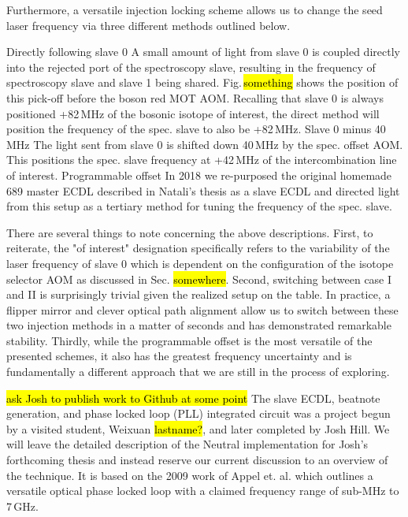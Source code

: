 Furthermore, a versatile injection locking scheme allows us to change the seed laser frequency via three different methods outlined below.
\begin{outline}[enumerate]
	\1 Directly following slave 0
		\2 A small amount of light from slave 0 is coupled directly into the rejected port of the spectroscopy slave, resulting in the frequency of spectroscopy slave and slave 1 being shared. 
		Fig.\,\hl{something} shows the position of this pick-off before the boson red MOT AOM. 
		Recalling that slave 0 is always positioned +82\,MHz of the bosonic isotope of interest, the direct method will position the frequency of the spec. slave to also be +82\,MHz.
	\1 Slave 0 minus 40\,MHz
		\2 The light sent from slave 0 is shifted down 40\,MHz by the spec. offset AOM. This positions the spec. slave frequency at +42\,MHz of the intercombination line of interest.
	\1 Programmable offset
		\2 In 2018 we re-purposed the original homemade 689 master ECDL described in Natali's thesis as a slave ECDL and directed light from this setup as a tertiary method for tuning the frequency of the spec. slave. 
\end{outline}
There are several things to note concerning the above descriptions.
First, to reiterate, the "of interest" designation specifically refers to the variability of the laser frequency of slave 0 which is dependent on the configuration of the isotope selector AOM as discussed in Sec. \hl{somewhere}.
Second, switching between case I and II is surprisingly trivial given the realized setup on the table.
In practice, a flipper mirror and clever optical path alignment allow us to switch between these two injection methods in a matter of seconds and has demonstrated remarkable stability.
Thirdly, while the programmable offset is the most versatile of the presented schemes, it also has the greatest frequency uncertainty and is fundamentally a different approach that we are still in the process of exploring.

\hl{ask Josh to publish work to Github at some point}
The slave ECDL, beatnote generation, and phase locked loop (PLL) integrated circuit was a project begun by a visited student, Weixuan \hl{lastname?}, and later completed by Josh Hill.
We will leave the detailed description of the Neutral implementation for Josh's forthcoming thesis and instead reserve our current discussion to an overview of the technique.
It is based on the 2009 work of Appel et. al. \cite{zfr08expansion} which outlines a versatile optical phase locked loop with a claimed frequency range of sub-MHz to 7\,GHz.


